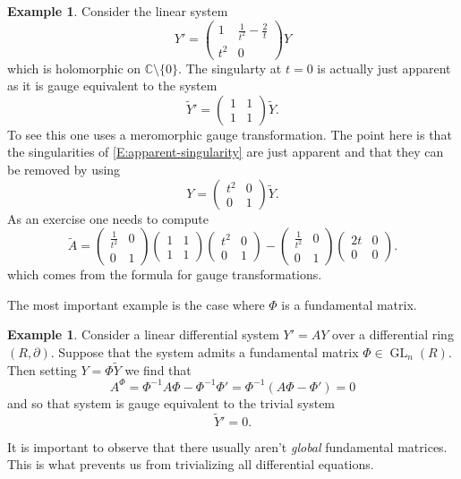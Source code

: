\documentclass[12pt]{book}
\numberwithin{equation}{section}
\theoremstyle{definition}
\newtheorem{example}[theorem]{Example}
\theoremstyle{remark}
\newcommand{\CC}{\mathbb{C}}
\newcommand{\GL}{\operatorname{GL}}
\begin{document}
\begin{example}
	Consider the linear system 
	\begin{equation}\label{E:apparent-singularity} 
	Y' = \begin{pmatrix}1 & \frac{1}{t^2} -\frac{2}{t} \\ t^2 & 0 \end{pmatrix} Y
	\end{equation}
	which is holomorphic on $\CC\setminus \lbrace 0 \rbrace$. 
	The singularty at $t=0$ is actually just apparent as it is gauge equivalent to the system
	$$ \widetilde{Y}' = \begin{pmatrix} 1 & 1 \\
	1 & 1 
	\end{pmatrix} \widetilde{Y}.$$
	To see this one uses a meromorphic gauge transformation.
	The point here is that the singularities of \eqref{E:apparent-singularity} are just apparent and that they can be removed by using 
	$$ Y =\begin{pmatrix}t^2 & 0 \\ 0 & 1 \end{pmatrix} \widetilde{Y}. $$
	As an exercise one needs to compute 
	$$ \widetilde{A} = \begin{pmatrix} \frac{1}{t^2} & 0 \\
	0 & 1\end{pmatrix} \begin{pmatrix}1 & 1 \\ 1 & 1 \end{pmatrix} \begin{pmatrix} t^2 & 0 \\ 0 & 1 \end{pmatrix} - \begin{pmatrix} \frac{1}{t^2} & 0 \\ 0 & 1 \end{pmatrix} \begin{pmatrix} 2t & 0 \\
	0 & 0 \end{pmatrix}.$$
	which comes from the formula for gauge transformations.
\end{example}

The most important example is the case where $\Phi$ is a fundamental matrix. 
\begin{example}
	Consider a linear differential system $Y'=AY$ over a differential ring $(R,\partial)$. 
	Suppose that the system admits a fundamental matrix $\Phi \in \GL_n(R)$. 
	Then setting $Y = \Phi \widetilde{Y}$ we find that 
	$$ A^{\Phi} = \Phi^{-1} A \Phi - \Phi^{-1} \Phi' = \Phi^{-1}( A\Phi - \Phi') =0 $$
	and so that system is gauge equivalent to the trivial system 
	$$ \widetilde{Y}' =0.$$
\end{example}
It is important to observe that there usually aren't \emph{global} fundamental matrices.
This is what prevents us from trivializing all differential equations.
\end{document}
